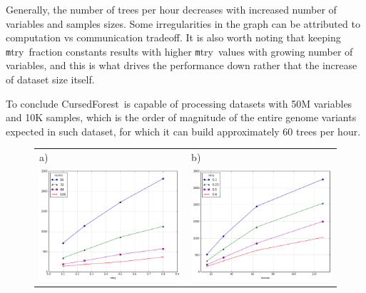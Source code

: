 \documentclass[10pt,letterpaper]{article}
\newcommand{\cursedforest}{{\sc CursedForest}}
\newcommand{\mtry}{{\texttt mtry}}
\begin{document}
Generally, the number of trees per hour decreases with increased number of variables and samples sizes. Some
irregularities in the graph can be attributed to computation vs communication tradeoff. It is also worth noting that
keeping \mtry\ fraction constants results with higher \mtry\ values with growing number of variables, and this is what
drives the performance down rather that the increase of dataset size itself.


To conclude \cursedforest\ is capable of processing datasets with 50M variables and 10K samples, which is the order of
magnitude of the entire genome variants expected in such dataset, for which it can build approximately 60 trees per
hour.




\begin{figure}[tbhp]
\begin{adjustwidth}{-1.00in}{0in}
\begin{tabular}{ll}
a)& b)\\
\includegraphics[totalheight=6cm]{./figs/mtry_cpu.png} & 
\includegraphics[totalheight=6cm]{./figs/cpu_mtry_trees_per_hour.png} \\

\end{tabular}
\end{adjustwidth}
\end{figure}
\end{document}
